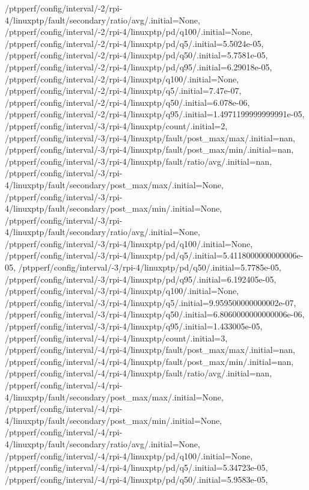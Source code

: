 {    /ptpperf/config/interval/-2/rpi-4/linuxptp/fault/secondary/ratio/avg/.initial=None,
    /ptpperf/config/interval/-2/rpi-4/linuxptp/pd/q100/.initial=None,
    /ptpperf/config/interval/-2/rpi-4/linuxptp/pd/q5/.initial=5.5024e-05,
    /ptpperf/config/interval/-2/rpi-4/linuxptp/pd/q50/.initial=5.7581e-05,
    /ptpperf/config/interval/-2/rpi-4/linuxptp/pd/q95/.initial=6.29018e-05,
    /ptpperf/config/interval/-2/rpi-4/linuxptp/q100/.initial=None,
    /ptpperf/config/interval/-2/rpi-4/linuxptp/q5/.initial=7.47e-07,
    /ptpperf/config/interval/-2/rpi-4/linuxptp/q50/.initial=6.078e-06,
    /ptpperf/config/interval/-2/rpi-4/linuxptp/q95/.initial=1.4971199999999991e-05,
    /ptpperf/config/interval/-3/rpi-4/linuxptp/count/.initial=2,
    /ptpperf/config/interval/-3/rpi-4/linuxptp/fault/post_max/max/.initial=nan,
    /ptpperf/config/interval/-3/rpi-4/linuxptp/fault/post_max/min/.initial=nan,
    /ptpperf/config/interval/-3/rpi-4/linuxptp/fault/ratio/avg/.initial=nan,
    /ptpperf/config/interval/-3/rpi-4/linuxptp/fault/secondary/post_max/max/.initial=None,
    /ptpperf/config/interval/-3/rpi-4/linuxptp/fault/secondary/post_max/min/.initial=None,
    /ptpperf/config/interval/-3/rpi-4/linuxptp/fault/secondary/ratio/avg/.initial=None,
    /ptpperf/config/interval/-3/rpi-4/linuxptp/pd/q100/.initial=None,
    /ptpperf/config/interval/-3/rpi-4/linuxptp/pd/q5/.initial=5.4118000000000006e-05,
    /ptpperf/config/interval/-3/rpi-4/linuxptp/pd/q50/.initial=5.7785e-05,
    /ptpperf/config/interval/-3/rpi-4/linuxptp/pd/q95/.initial=6.192405e-05,
    /ptpperf/config/interval/-3/rpi-4/linuxptp/q100/.initial=None,
    /ptpperf/config/interval/-3/rpi-4/linuxptp/q5/.initial=9.959500000000002e-07,
    /ptpperf/config/interval/-3/rpi-4/linuxptp/q50/.initial=6.8060000000000006e-06,
    /ptpperf/config/interval/-3/rpi-4/linuxptp/q95/.initial=1.433005e-05,
    /ptpperf/config/interval/-4/rpi-4/linuxptp/count/.initial=3,
    /ptpperf/config/interval/-4/rpi-4/linuxptp/fault/post_max/max/.initial=nan,
    /ptpperf/config/interval/-4/rpi-4/linuxptp/fault/post_max/min/.initial=nan,
    /ptpperf/config/interval/-4/rpi-4/linuxptp/fault/ratio/avg/.initial=nan,
    /ptpperf/config/interval/-4/rpi-4/linuxptp/fault/secondary/post_max/max/.initial=None,
    /ptpperf/config/interval/-4/rpi-4/linuxptp/fault/secondary/post_max/min/.initial=None,
    /ptpperf/config/interval/-4/rpi-4/linuxptp/fault/secondary/ratio/avg/.initial=None,
    /ptpperf/config/interval/-4/rpi-4/linuxptp/pd/q100/.initial=None,
    /ptpperf/config/interval/-4/rpi-4/linuxptp/pd/q5/.initial=5.34723e-05,
    /ptpperf/config/interval/-4/rpi-4/linuxptp/pd/q50/.initial=5.9583e-05,
}
